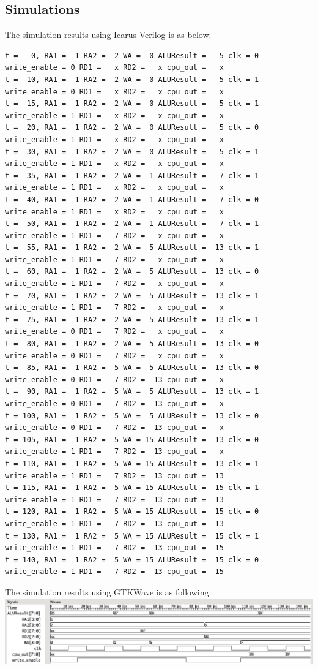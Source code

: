 \documentclass{article}
\begin{document}
\subsection{Simulations}
The simulation results using Icarus Verilog is as below:
\begin{Verbatim}[fontsize = \scriptsize]
t =   0, RA1 =  1 RA2 =  2 WA =  0 ALUResult =   5 clk = 0 write_enable = 0 RD1 =   x RD2 =   x cpu_out =   x
t =  10, RA1 =  1 RA2 =  2 WA =  0 ALUResult =   5 clk = 1 write_enable = 0 RD1 =   x RD2 =   x cpu_out =   x
t =  15, RA1 =  1 RA2 =  2 WA =  0 ALUResult =   5 clk = 1 write_enable = 1 RD1 =   x RD2 =   x cpu_out =   x
t =  20, RA1 =  1 RA2 =  2 WA =  0 ALUResult =   5 clk = 0 write_enable = 1 RD1 =   x RD2 =   x cpu_out =   x
t =  30, RA1 =  1 RA2 =  2 WA =  0 ALUResult =   5 clk = 1 write_enable = 1 RD1 =   x RD2 =   x cpu_out =   x
t =  35, RA1 =  1 RA2 =  2 WA =  1 ALUResult =   7 clk = 1 write_enable = 1 RD1 =   x RD2 =   x cpu_out =   x
t =  40, RA1 =  1 RA2 =  2 WA =  1 ALUResult =   7 clk = 0 write_enable = 1 RD1 =   x RD2 =   x cpu_out =   x
t =  50, RA1 =  1 RA2 =  2 WA =  1 ALUResult =   7 clk = 1 write_enable = 1 RD1 =   7 RD2 =   x cpu_out =   x
t =  55, RA1 =  1 RA2 =  2 WA =  5 ALUResult =  13 clk = 1 write_enable = 1 RD1 =   7 RD2 =   x cpu_out =   x
t =  60, RA1 =  1 RA2 =  2 WA =  5 ALUResult =  13 clk = 0 write_enable = 1 RD1 =   7 RD2 =   x cpu_out =   x
t =  70, RA1 =  1 RA2 =  2 WA =  5 ALUResult =  13 clk = 1 write_enable = 1 RD1 =   7 RD2 =   x cpu_out =   x
t =  75, RA1 =  1 RA2 =  2 WA =  5 ALUResult =  13 clk = 1 write_enable = 0 RD1 =   7 RD2 =   x cpu_out =   x
t =  80, RA1 =  1 RA2 =  2 WA =  5 ALUResult =  13 clk = 0 write_enable = 0 RD1 =   7 RD2 =   x cpu_out =   x
t =  85, RA1 =  1 RA2 =  5 WA =  5 ALUResult =  13 clk = 0 write_enable = 0 RD1 =   7 RD2 =  13 cpu_out =   x
t =  90, RA1 =  1 RA2 =  5 WA =  5 ALUResult =  13 clk = 1 write_enable = 0 RD1 =   7 RD2 =  13 cpu_out =   x
t = 100, RA1 =  1 RA2 =  5 WA =  5 ALUResult =  13 clk = 0 write_enable = 0 RD1 =   7 RD2 =  13 cpu_out =   x
t = 105, RA1 =  1 RA2 =  5 WA = 15 ALUResult =  13 clk = 0 write_enable = 1 RD1 =   7 RD2 =  13 cpu_out =   x
t = 110, RA1 =  1 RA2 =  5 WA = 15 ALUResult =  13 clk = 1 write_enable = 1 RD1 =   7 RD2 =  13 cpu_out =  13
t = 115, RA1 =  1 RA2 =  5 WA = 15 ALUResult =  15 clk = 1 write_enable = 1 RD1 =   7 RD2 =  13 cpu_out =  13
t = 120, RA1 =  1 RA2 =  5 WA = 15 ALUResult =  15 clk = 0 write_enable = 1 RD1 =   7 RD2 =  13 cpu_out =  13
t = 130, RA1 =  1 RA2 =  5 WA = 15 ALUResult =  15 clk = 1 write_enable = 1 RD1 =   7 RD2 =  13 cpu_out =  15
t = 140, RA1 =  1 RA2 =  5 WA = 15 ALUResult =  15 clk = 0 write_enable = 1 RD1 =   7 RD2 =  13 cpu_out =  15 
\end{Verbatim}
The simulation results using GTKWave is as following:\vspace{5pt}\\
\includegraphics[width=\textwidth]{reg_file.png}
\end{document}
